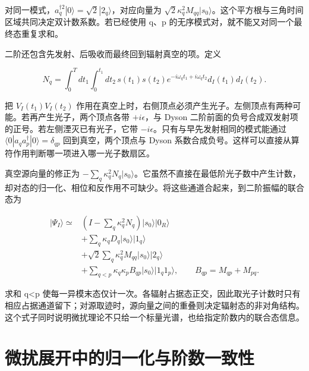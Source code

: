 \documentclass[UTF8,a4paper,zihao=-4,openany,fontset=fandol]{ctexbook}
\begin{document}
对同一模式，$a_q^{\dagger2}|0\rangle=\sqrt2|2_q\rangle$，对应向量为 $\sqrt2\kappa_q^2M_{qq}|s_0\rangle$。这个平方根与三角时间区域共同决定双计数系数。若已经使用 q、p 的无序模式对，就不能又对同一个最终态重复求和。



二阶还包含先发射、后吸收而最终回到辐射真空的项。定义



\begin{equation*}
N_q=\int_0^Tdt_1\int_0^{t_1}dt_2\,
s(t_1)s(t_2)e^{-i\omega_qt_1+i\omega_qt_2}
d_I(t_1)d_I(t_2).
\tag{6.7}\label{eq:6.7}
\end{equation*}


把 $V_I(t_1)V_I(t_2)$ 作用在真空上时，右侧顶点必须产生光子。左侧顶点有两种可能。若再产生光子，两个顶点各带 $+i\epsilon$，与 Dyson 二阶前面的负号合成双发射项的正号。若左侧湮灭已有光子，它带 $-i\epsilon$。只有与早先发射相同的模式能通过 $\langle0|a_q a_p^\dagger|0\rangle=\delta_{qp}$ 回到真空，两个顶点与 Dyson 系数合成负号。这样可以直接从算符作用判断哪一项进入哪一光子数扇区。



真空源向量的修正为 $-\sum_q\kappa_q^2N_q|s_0\rangle$。它虽然不直接在最低阶光子数中产生计数，却对态的归一化、相位和反作用不可缺少。将这些通道合起来，到二阶振幅的联合态为



\begin{equation*}
\begin{aligned}
|\Psi_I\rangle\simeq{}&
\left(I-\sum_q\kappa_q^2N_q\right)|s_0\rangle|0_R\rangle\\
&+\sum_q\kappa_qD_q|s_0\rangle|1_q\rangle\\
&+\sqrt2\sum_q\kappa_q^2M_{qq}|s_0\rangle|2_q\rangle\\
&+\sum_{q<p}\kappa_q\kappa_pB_{qp}|s_0\rangle|1_q1_p\rangle,
\qquad B_{qp}=M_{qp}+M_{pq}.
\end{aligned}
\tag{6.8}\label{eq:6.8}
\end{equation*}


求和 q<p 使每一异模末态仅计一次。各辐射占据态正交，因此取光子计数时只有相应占据通道留下；对源取迹时，源向量之间的重叠则决定辐射态的非对角结构。这个式子同时说明微扰理论不只给一个标量光谱，也给指定阶数内的联合态信息。



\section{微扰展开中的归一化与阶数一致性}\label{sec:06:9}
\end{document}
